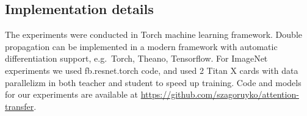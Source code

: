 \documentclass{article} \usepackage{iclr2017_conference}
\begin{document}
\newpage
\subsection{Implementation details}

The experiments were conducted in Torch machine learning framework. Double propagation can be implemented in a modern framework with automatic differentiation support, e.g.\ Torch, Theano, Tensorflow. For ImageNet experiments we used fb.resnet.torch code, and used 2 Titan X cards with data parallelizm in both teacher and student to speed up training. Code and models for our experiments are available at \url{https://github.com/szagoruyko/attention-transfer}.
\end{document}
